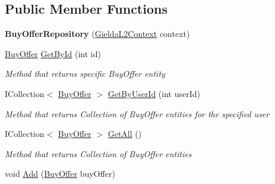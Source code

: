 \subsection*{Public Member Functions}
\begin{DoxyCompactItemize}
\item 
\mbox{\label{class_gielda_l2_1_1_i_n_f_r_a_s_t_r_u_c_t_u_r_e_1_1_repositories_1_1_buy_offer_repository_a19cad114d64f5aa1b37e7f664cb1215f}} 
{\bfseries Buy\+Offer\+Repository} (\mbox{\hyperlink{class_gielda_l2_1_1_d_b_1_1_gielda_l2_context}{Gielda\+L2\+Context}} context)
\item 
\mbox{\hyperlink{class_gielda_l2_1_1_d_b_1_1_entities_1_1_buy_offer}{Buy\+Offer}} \mbox{\hyperlink{class_gielda_l2_1_1_i_n_f_r_a_s_t_r_u_c_t_u_r_e_1_1_repositories_1_1_buy_offer_repository_adf2f5395c33786befc29d371aecee31d}{Get\+By\+Id}} (int id)
\begin{DoxyCompactList}\small\item\em Method that returns specific Buy\+Offer entity \end{DoxyCompactList}\item 
I\+Collection$<$ \mbox{\hyperlink{class_gielda_l2_1_1_d_b_1_1_entities_1_1_buy_offer}{Buy\+Offer}} $>$ \mbox{\hyperlink{class_gielda_l2_1_1_i_n_f_r_a_s_t_r_u_c_t_u_r_e_1_1_repositories_1_1_buy_offer_repository_a068d5dc2abf5a84ebd32a5cc6d2d835b}{Get\+By\+User\+Id}} (int user\+Id)
\begin{DoxyCompactList}\small\item\em Method that returns Collection of Buy\+Offer entities for the specified user \end{DoxyCompactList}\item 
I\+Collection$<$ \mbox{\hyperlink{class_gielda_l2_1_1_d_b_1_1_entities_1_1_buy_offer}{Buy\+Offer}} $>$ \mbox{\hyperlink{class_gielda_l2_1_1_i_n_f_r_a_s_t_r_u_c_t_u_r_e_1_1_repositories_1_1_buy_offer_repository_ab0ce549916d7e0cd138454a9768ed7c5}{Get\+All}} ()
\begin{DoxyCompactList}\small\item\em Method that returns Collection of Buy\+Offer entities \end{DoxyCompactList}\item 
void \mbox{\hyperlink{class_gielda_l2_1_1_i_n_f_r_a_s_t_r_u_c_t_u_r_e_1_1_repositories_1_1_buy_offer_repository_aeffc5aeab22da20ecaa887219079c5a1}{Add}} (\mbox{\hyperlink{class_gielda_l2_1_1_d_b_1_1_entities_1_1_buy_offer}{Buy\+Offer}} buy\+Offer)

\end{DoxyCompactItemize}
